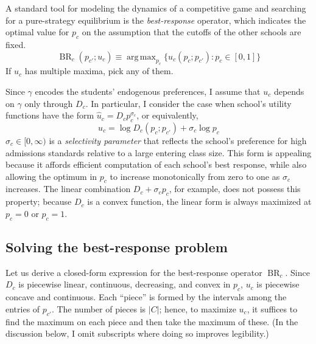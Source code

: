 \documentclass[12pt]{article}
\numberwithin{equation}{subsection}
\theoremstyle{definition}
\DeclareMathOperator*{\argmax}{arg\,max}
\begin{document}
A standard tool for modeling the dynamics of a competitive game and searching for a pure-strategy equilibrium is the \emph{best-response} operator, which indicates the optimal value for $p_c$ on the assumption that the cutoffs of the other schools are fixed.
\begin{equation}\operatorname{BR}_c  (p_{c'} ; u_c) \equiv \argmax_{p_c}\bigl\{ u_c(p_c; p_{c'}): p_c \in [0,1] \bigr\}\end{equation}
If $u_c$ has multiple maxima, pick any of them. 

Since $\gamma$ encodes the students' endogenous preferences, I assume that $u_c$ depends on $\gamma$ only through $D_c$. In particular, I consider the case when school's utility functions have the form $\hat u_c = D_c p_c^{\sigma_c}$, or equivalently,
\begin{equation} u_c = \log D_c(p_c; p_{c'})  + \sigma_c \log p_c \end{equation}
$\sigma_c \in [0, \infty)$ is a \emph{selectivity parameter} that reflects the school's preference for high admissions standards relative to a large entering class size. This form is appealing because it affords efficient computation of each school's best response, while also allowing the optimum in $p_c$ to increase monotonically from zero to one as $\sigma_c$ increases. The linear combination $D_c + \sigma_c p_c$, for example, does not possess this property; because $D_c$ is a convex function, the linear form is always maximized at $p_c = 0$ or $p_c =1$.




\subsection{Solving the best-response problem}
Let us derive a closed-form expression for the best-response operator $\operatorname{BR}_c$. Since $D_c$ is piecewise linear, continuous, decreasing, and convex in $p_c$, $u_c$ is piecewise concave and continuous. Each ``piece'' is formed by the intervals among the entries of $p_{c'}$. The number of pieces is $|C|$; hence, to maximize $u_c$, it suffices to find the maximum on each piece and then take the maximum of these. (In the discussion below, I omit subscripts where doing so improves legibility.)
\end{document}
